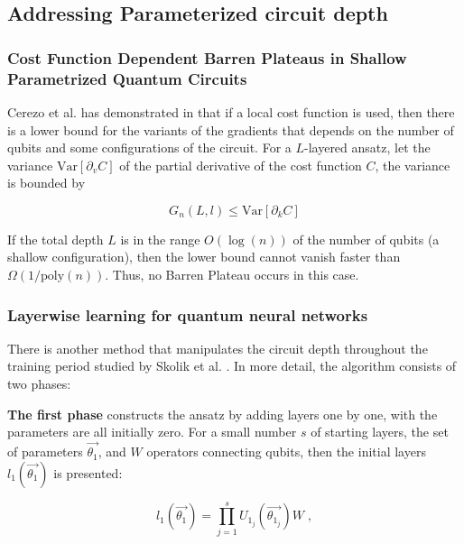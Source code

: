 \subsection{Addressing Parameterized circuit depth}

\subsubsection{Cost Function Dependent Barren Plateaus in Shallow Parametrized Quantum Circuits \texorpdfstring{\cite{cerezo2021variational}}{} }

Cerezo et al. has demonstrated in \cite{cerezoCostFunctionDependent2021} that if a local cost function is used, then there is a lower bound for the variants of the gradients that depends on the number of qubits and some configurations of the circuit. 
For a $L$-layered ansatz, let the variance $\mathrm{Var}[\partial_v C]$ of the partial derivative of the cost function $C$, the variance is bounded by

\begin{equation}
    G_n(L,l) \leq \mathrm{Var}[\partial_k C]
\end{equation}

If the total depth $L$ is in the range $O(\log(n))$ of the number of qubits (a shallow configuration), then the lower bound cannot vanish faster than $\Omega(1/\mathrm{poly}(n))$. Thus, no Barren Plateau occurs in this case.



\subsubsection{Layerwise learning for quantum neural networks \texorpdfstring{\cite{skolikLayerwiseLearningQuantum2021}}{} }

There is another method that manipulates the circuit depth throughout the training period studied by Skolik et al. \cite{skolikLayerwiseLearningQuantum2021}. 
In more detail, the algorithm consists of two phases:

\textbf{The first phase} constructs the ansatz by adding layers one by one, with the parameters are all initially zero. For a small number $s$ of starting layers, the set of parameters $\vec{\theta_1}$, and $W$ operators connecting qubits, then the initial layers $l_1(\vec{\theta_1})$ is presented:

\begin{equation}
    l_1(\vec{\theta_1})
    = \prod_{j=1}^s U_{1_j}(\vec{\theta_{1_j}}) W \;,
\end{equation}

